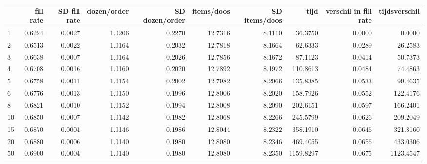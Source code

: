 \begin{tabular}{lrrrrrrrrr}
\toprule
{} &  fill rate &  SD fill rate &  dozen/order &  SD dozen/order &  items/doos &  SD items/doos &       tijd &  verschil in fill rate &  tijdsverschil \\
\midrule
1  &     0.6224 &        0.0027 &       1.0206 &          0.2270 &     12.7316 &         8.1110 &    36.3750 &                 0.0000 &         0.0000 \\
2  &     0.6513 &        0.0022 &       1.0164 &          0.2032 &     12.7818 &         8.1664 &    62.6333 &                 0.0289 &        26.2583 \\
3  &     0.6638 &        0.0007 &       1.0164 &          0.2026 &     12.7856 &         8.1672 &    87.1123 &                 0.0414 &        50.7373 \\
4  &     0.6708 &        0.0016 &       1.0160 &          0.2020 &     12.7892 &         8.1972 &   110.8613 &                 0.0484 &        74.4863 \\
5  &     0.6758 &        0.0011 &       1.0154 &          0.2002 &     12.7982 &         8.2066 &   135.8385 &                 0.0533 &        99.4635 \\
6  &     0.6776 &        0.0013 &       1.0150 &          0.1996 &     12.8006 &         8.2020 &   158.7926 &                 0.0552 &       122.4176 \\
8  &     0.6821 &        0.0010 &       1.0152 &          0.1994 &     12.8008 &         8.2090 &   202.6151 &                 0.0597 &       166.2401 \\
10 &     0.6850 &        0.0007 &       1.0142 &          0.1982 &     12.8068 &         8.2266 &   245.5799 &                 0.0626 &       209.2049 \\
15 &     0.6870 &        0.0004 &       1.0146 &          0.1986 &     12.8044 &         8.2322 &   358.1910 &                 0.0646 &       321.8160 \\
20 &     0.6880 &        0.0006 &       1.0140 &          0.1980 &     12.8080 &         8.2346 &   469.4055 &                 0.0656 &       433.0306 \\
50 &     0.6900 &        0.0004 &       1.0140 &          0.1980 &     12.8080 &         8.2350 &  1159.8297 &                 0.0675 &      1123.4547 \\
\bottomrule
\end{tabular}
